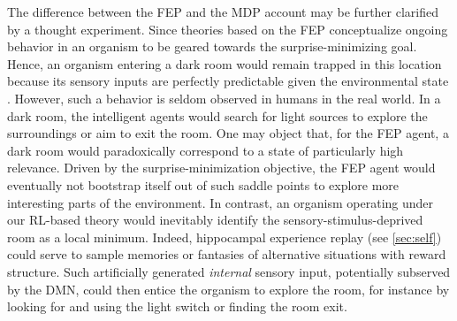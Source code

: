\documentclass[10pt,letterpaper]{article}
\begin{document}
The difference between the FEP and the MDP account may be further clarified by a thought experiment.
Since theories based on the FEP \citep{friston2010free,fristonAIorRL}
conceptualize ongoing behavior
in an organism to be geared towards the surprise-minimizing goal.
Hence, an organism entering a dark room
would remain trapped in this location
because its sensory inputs are perfectly predictable
given the environmental state \citep{darkroom2012}.
However, such a behavior is seldom observed in humans in the
real world. In a dark room, the intelligent agents would search for light sources to explore
the surroundings or aim to exit the room.
One may object that, for the FEP agent,
a dark room would paradoxically correspond to a state of particularly high relevance.
Driven by the surprise-minimization objective, the FEP agent would eventually not bootstrap itself out of such saddle points to explore more interesting parts of the environment.
In contrast, an organism operating under our RL-based theory would inevitably
identify the sensory-stimulus-deprived room as a local minimum. Indeed, hippocampal experience replay (see \ref{sec:self}) could serve to sample memories or fantasies of alternative situations
with reward structure. Such artificially generated \textit{internal} sensory input,
potentially subserved by the DMN, could then entice the organism to explore the room,
for instance by looking for and using the light switch or finding the room exit.
\end{document}
